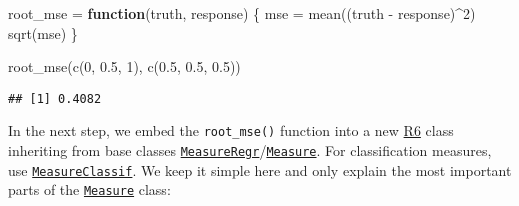 \documentclass[
]{scrbook}
\newenvironment{Shaded}{\begin{snugshade}}{\end{snugshade}}
\newcommand{\ControlFlowTok}[1]{\textcolor[rgb]{0.13,0.29,0.53}{\textbf{#1}}}
\newcommand{\DecValTok}[1]{\textcolor[rgb]{0.00,0.00,0.81}{#1}}
\newcommand{\FloatTok}[1]{\textcolor[rgb]{0.00,0.00,0.81}{#1}}
\newcommand{\FunctionTok}[1]{\textcolor[rgb]{0.00,0.00,0.00}{#1}}
\newcommand{\NormalTok}[1]{#1}
\newcommand{\OtherTok}[1]{\textcolor[rgb]{0.56,0.35,0.01}{#1}}
\newcommand{\SpecialCharTok}[1]{\textcolor[rgb]{0.00,0.00,0.00}{#1}}
\renewenvironment{Shaded} {\begin{snugshade}\small} {\end{snugshade}}
\begin{document}
\begin{Shaded}
\begin{Highlighting}[]
\NormalTok{root\_mse }\OtherTok{=} \ControlFlowTok{function}\NormalTok{(truth, response) \{}
\NormalTok{  mse }\OtherTok{=} \FunctionTok{mean}\NormalTok{((truth }\SpecialCharTok{{-}}\NormalTok{ response)}\SpecialCharTok{\^{}}\DecValTok{2}\NormalTok{)}
  \FunctionTok{sqrt}\NormalTok{(mse)}
\NormalTok{\}}

\FunctionTok{root\_mse}\NormalTok{(}\FunctionTok{c}\NormalTok{(}\DecValTok{0}\NormalTok{, }\FloatTok{0.5}\NormalTok{, }\DecValTok{1}\NormalTok{), }\FunctionTok{c}\NormalTok{(}\FloatTok{0.5}\NormalTok{, }\FloatTok{0.5}\NormalTok{, }\FloatTok{0.5}\NormalTok{))}
\end{Highlighting}
\end{Shaded}

\begin{verbatim}
## [1] 0.4082
\end{verbatim}

In the next step, we embed the \texttt{root\_mse()} function into a new \href{https://cran.r-project.org/package=R6}{R6} class inheriting from base classes \href{https://mlr3.mlr-org.com/reference/MeasureRegr.html}{\texttt{MeasureRegr}}/\href{https://mlr3.mlr-org.com/reference/Measure.html}{\texttt{Measure}}.
For classification measures, use \href{https://mlr3.mlr-org.com/reference/MeasureClassif.html}{\texttt{MeasureClassif}}.
We keep it simple here and only explain the most important parts of the \href{https://mlr3.mlr-org.com/reference/Measure.html}{\texttt{Measure}} class:
\end{document}
